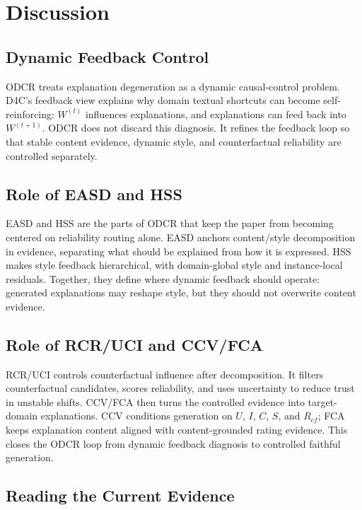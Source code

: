 \section{Discussion}

\subsection{Dynamic Feedback Control}

ODCR treats explanation degeneration as a dynamic causal-control problem. D4C's
feedback view explains why domain textual shortcuts can become
self-reinforcing: \(W^{(t)}\) influences explanations, and explanations can
feed back into \(W^{(t+1)}\). ODCR does not discard this diagnosis. It refines
the feedback loop so that stable content evidence, dynamic style, and
counterfactual reliability are controlled separately.

\subsection{Role of EASD and HSS}

EASD and HSS are the parts of ODCR that keep the paper from becoming centered
on reliability routing alone. EASD anchors content/style decomposition in evidence, separating what
should be explained from how it is expressed. HSS makes style feedback
hierarchical, with domain-global style and instance-local residuals. Together,
they define where dynamic feedback should operate: generated explanations may
reshape style, but they should not overwrite content evidence.

\subsection{Role of RCR/UCI and CCV/FCA}

RCR/UCI controls counterfactual influence after decomposition. It filters
counterfactual candidates, scores reliability, and uses uncertainty to reduce
trust in unstable shifts. CCV/FCA then turns the controlled evidence into
target-domain explanations. CCV conditions generation on \(U\), \(I\), \(C\),
\(S\), and \(R_{cf}\); FCA keeps explanation content aligned with
content-grounded rating evidence. This closes the ODCR loop from dynamic
feedback diagnosis to controlled faithful generation.

\subsection{Reading the Current Evidence}

